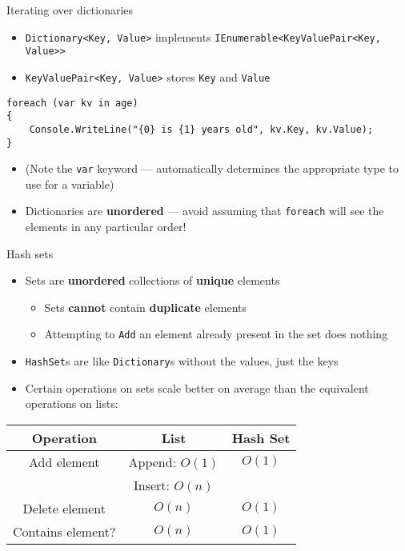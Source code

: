 \begin{frame}[fragile]{Iterating over dictionaries}
	\begin{itemize}
		\pause\item \lstinline{Dictionary<Key, Value>} implements \lstinline{IEnumerable<KeyValuePair<Key, Value>>}
		\pause\item \lstinline{KeyValuePair<Key, Value>} stores \lstinline{Key} and \lstinline{Value}
	\end{itemize}		
	\pause
	\begin{lstlisting}
foreach (var kv in age)
{
    Console.WriteLine("{0} is {1} years old", kv.Key, kv.Value);
}
	\end{lstlisting}
	\begin{itemize}
	    \pause\item (Note the \lstinline{var} keyword --- automatically determines the appropriate type to use for a variable)
		\pause\item Dictionaries are \textbf{unordered} --- avoid assuming that \lstinline{foreach}
		    will see the elements in any particular order!
	\end{itemize}		
\end{frame}

\begin{frame}{Hash sets}
	\begin{itemize}
		\pause\item Sets are \textbf{unordered} collections of \textbf{unique} elements
            \begin{itemize}
                \pause\item Sets \textbf{cannot} contain \textbf{duplicate} elements
                \pause\item Attempting to \lstinline{Add} an element already present in the set does nothing
            \end{itemize}
		\pause\item \lstinline{HashSet}s are like \lstinline{Dictionary}s without the values, just the keys
		\pause\item Certain operations on sets scale better on average than the equivalent operations on lists:
	\end{itemize}
	\pause
	\begin{center}
		\begin{tabular}{|c|c|c|}
			\hline
			\textbf{Operation} & \textbf{List} & \textbf{Hash Set} \\\hline
			Add element & Append: $O(1)$ & $O(1)$ \\
			& Insert: $O(n)$ & \\\hline
			Delete element & $O(n)$ & $O(1)$ \\\hline
			Contains element? & $O(n)$ & $O(1)$ \\\hline
		\end{tabular}
	\end{center}
\end{frame}


